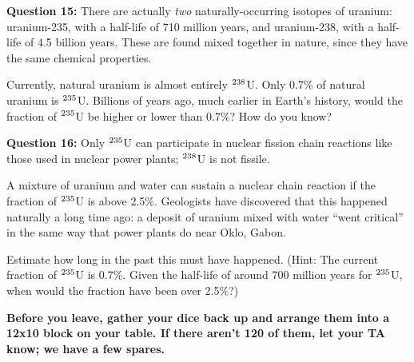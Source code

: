 \documentclass[11pt]{article}
\begin{document}
\vspace{1.5in}
\newpage

{\bf Question 15:} There are actually {\it two} naturally-occurring isotopes of uranium: uranium-235, with a half-life of 710 million years, and uranium-238, with a half-life of 4.5 billion years. These are found mixed together in nature, since they have the same chemical properties.

Currently, natural uranium is almost entirely $\null^{238}$U. Only 0.7\% of natural uranium is $\null^{235}$U. Billions of years ago, much earlier in Earth's history, would the fraction of $\null^{235}$U be higher or lower than 0.7\%? How do you know?

\vspace{2in}

{\bf Question 16:} Only $\null^{235}$U can participate in nuclear fission chain reactions like those used in nuclear power plants; $\null^{238}$U is not fissile.

A mixture of uranium and water can sustain a nuclear chain reaction if the fraction of $\null^{235}$U is above 2.5\%. Geologists have discovered that this happened naturally a long time ago: a deposit of uranium mixed with water ``went critical'' in the same way that power plants do near Oklo, Gabon.

Estimate how long in the past this must have happened. (Hint: The current fraction of $\null^{235}$U is 0.7\%. Given the half-life of around 700 million years for $\null^{235}$U, when would the fraction have been over 2.5\%?)

\vspace{3in}

\large

{\bf Before you leave, gather your dice back up and arrange them into a 12x10 block on your table. If there aren't 120 of them, let your TA know; we have a few spares.}
\end{document}
